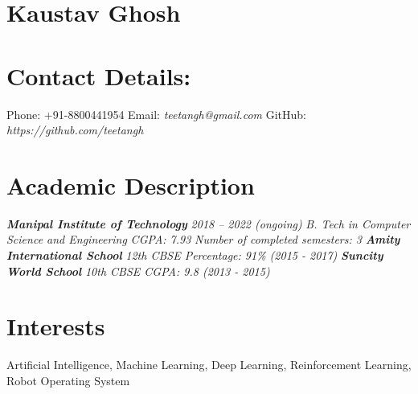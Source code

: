 \documentclass[a4paper,12pt]{article}
\begin{document}
    


\begin{multicols}{2}
\section*{\LARGE{Kaustav Ghosh}}
    \section*{Contact Details:}
        Phone: +91-8800441954
        \newline
        Email: \textit{teetangh@gmail.com}
        \newline
        GitHub: \textit{https://github.com/teetangh}
        \newline
        
    \section*{Academic Description}
        \textbf{\emph{Manipal Institute of Technology}}
        \newline
        \textit{2018 – 2022 (ongoing)}
        \newline
        \textit{B. Tech in Computer Science and Engineering}
        \newline
        \textit{CGPA: 7.93}
        \newline
        \textit{Number of completed semesters: 3}
        \newline
        \textbf{\emph{Amity International School}}
        \newline
        \textit{12th CBSE Percentage: 91\% (2015 - 2017)}
        \newline
        \textbf{\emph{Suncity World School}}
        \newline
        \textit{10th CBSE CGPA: 9.8 (2013 - 2015)}
\end{multicols}

\section*{Interests}
Artificial Intelligence,
Machine Learning,
Deep Learning,
Reinforcement Learning,
Robot Operating System
    
\end{document}
